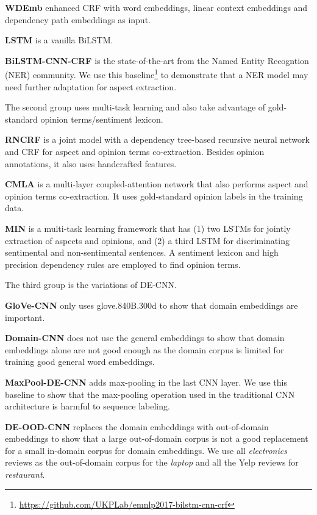 \textbf{WDEmb} \cite{yin2016unsupervised} enhanced CRF with word embeddings, linear context embeddings and dependency path embeddings as input.

\textbf{LSTM} \cite{liu2015fine,li2017deep} is a vanilla BiLSTM.

\textbf{BiLSTM-CNN-CRF} \cite{Reimers:2017:EMNLP} is the state-of-the-art from the Named Entity Recogntion (NER) community. We use this baseline\footnote{\url{https://github.com/UKPLab/emnlp2017-bilstm-cnn-crf} } to demonstrate that a NER model may need further adaptation for aspect extraction.

The second group uses multi-task learning and also take advantage of gold-standard opinion terms/sentiment lexicon.

\textbf{RNCRF} \cite{wang2016recursive} is a joint model with a dependency tree-based recursive neural network and CRF for aspect and opinion terms co-extraction. 
Besides opinion annotations, it also uses handcrafted features.

\textbf{CMLA} \cite{wang2017coupled} is a multi-layer coupled-attention network that also performs aspect and opinion terms co-extraction. It uses gold-standard opinion labels in the training data.

\textbf{MIN} \cite{li2017deep} is a multi-task learning framework that has (1) two LSTMs for jointly extraction of aspects and opinions, and (2) a third LSTM for discriminating sentimental and non-sentimental sentences. 
A sentiment lexicon and high precision dependency rules are employed to find opinion terms. 

The third group is the variations of DE-CNN.

\textbf{GloVe-CNN} only uses glove.840B.300d to show that domain embeddings are important. 

\textbf{Domain-CNN} does not use the general embeddings to show that domain embeddings alone are not good enough as the domain corpus is limited for training good general word embeddings.

\textbf{MaxPool-DE-CNN} adds max-pooling in the last CNN layer. We use this baseline to show that the max-pooling operation used in the traditional CNN architecture is harmful to sequence labeling.

\textbf{DE-OOD-CNN} replaces the domain embeddings with out-of-domain embeddings to show that a large out-of-domain corpus is not a good replacement for a small in-domain corpus for domain embeddings.
We use all \textit{electronics} reviews as the out-of-domain corpus for the \textit{laptop} and all the Yelp reviews for \textit{restaurant}.

